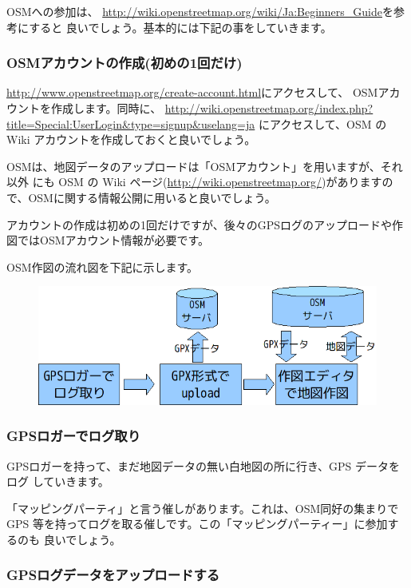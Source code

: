 \documentclass[mingoth,a4paper]{jsarticle}
\begin{document}
OSMへの参加は、
\url{http://wiki.openstreetmap.org/wiki/Ja:Beginners_Guide}を参考にすると
良いでしょう。基本的には下記の事をしていきます。

\subsubsection{OSMアカウントの作成(初めの1回だけ)}

\url{http://www.openstreetmap.org/create-account.html}にアクセスして、
OSMアカウントを作成します。同時に、
\url{http://wiki.openstreetmap.org/index.php?title=Special:UserLogin&type=signup&uselang=ja}
にアクセスして、OSM の Wiki アカウントを作成しておくと良いでしょう。

OSMは、地図データのアップロードは「OSMアカウント」を用いますが、それ以外
にも OSM の Wiki ページ(\url{http://wiki.openstreetmap.org/})がありますの
で、OSMに関する情報公開に用いると良いでしょう。

アカウントの作成は初めの1回だけですが、後々のGPSログのアップロードや作図ではOSMアカウント情報が必要です。

OSM作図の流れ図を下記に示します。

\begin{figure}[h]
 \centering
 \includegraphics[scale=0.7]{image200912/debianosm4.png}
\end{figure}


\subsubsection{GPSロガーでログ取り}

GPSロガーを持って、まだ地図データの無い白地図の所に行き、GPS データをログ
していきます。

「マッピングパーティ」と言う催しがあります。これは、OSM同好の集まりでGPS
等を持ってログを取る催しです。この「マッピングパーティー」に参加するのも
良いでしょう。

\subsubsection{GPSログデータをアップロードする}
\end{document}
